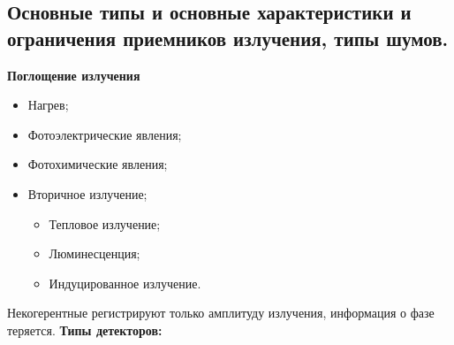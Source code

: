 \documentclass[12pt]{article}
\begin{document}
\subsection{Основные типы и основные характеристики и ограничения приемников излучения, типы шумов.}
\textbf{Поглощение излучения}
\begin{itemize}
	\item Нагрев;
	\item Фотоэлектрические явления;
	\item Фотохимические явления;
	\item Вторичное излучение;
		\begin{itemize}
			\item Тепловое излучение;
			\item Люминесценция;
			\item Индуцированное излучение.
	\end{itemize}
	
\end{itemize}
Некогерентные регистрируют только амплитуду излучения,
информация о фазе теряется.\newpage
\textbf{Типы детекторов:}
\end{document}
